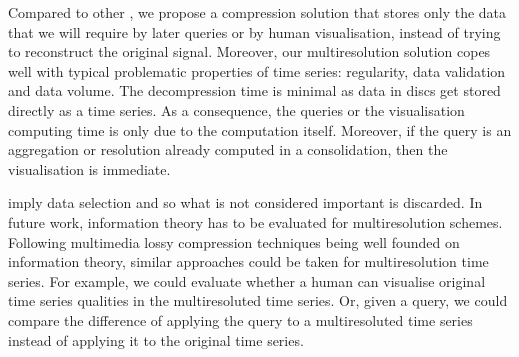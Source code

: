Compared to other , we propose a compression solution that
stores only the data that we will require by later queries or by
human visualisation, instead of trying to reconstruct the original
signal.  Moreover, our multiresolution solution copes well with
typical problematic properties of time series: regularity, data
validation and data volume.  The decompression time is minimal as data
in discs get stored directly as a time series. As a consequence, the
queries or the visualisation computing time is only due to the
computation itself. Moreover, if the query is an aggregation or
resolution already computed in a  consolidation, then the
visualisation is immediate.


 imply data selection and so what is not considered
important is discarded.  In future work, information theory has to be
evaluated for multiresolution schemes. Following multimedia lossy
compression techniques being well founded on information theory,
similar approaches could be taken for multiresolution time series. For
example, we could evaluate whether a human can visualise original
time series qualities in the multiresoluted time series. Or, given a
query, we could compare the difference of applying the query to a
multiresoluted time series instead of applying it to the original time
series.





